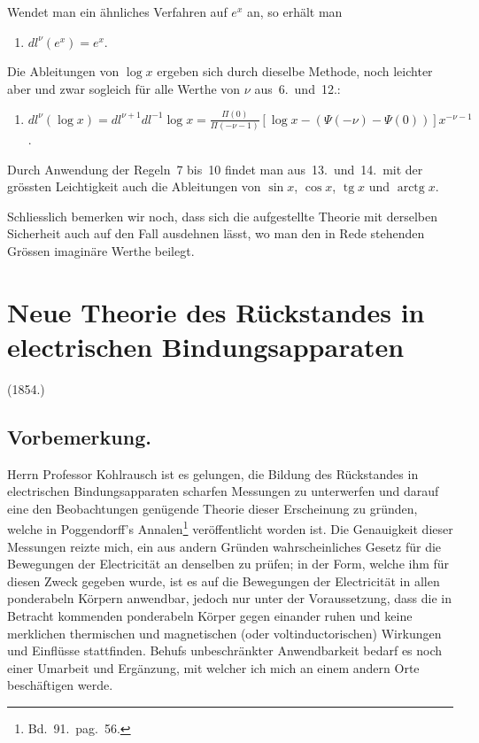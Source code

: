 \documentclass[12pt,a4paper]{article}
\DeclareMathOperator{\tg}{tg}
\DeclareMathOperator{\arctg}{arctg}
\begin{document}
Wendet man ein \"ahnliches Verfahren auf $e^x$ an, so erh\"alt man
\begin{enumerate}
\item[$13$.] $\displaystyle dl^\nu(e^x) = e^x$.
\end{enumerate}
Die Ableitungen von $\log x$ ergeben sich durch dieselbe Methode, noch leichter aber und zwar sogleich f\"ur alle Werthe von $\nu$ aus~6.\ und~12.:
\begin{enumerate}
\item[$14$.] $\displaystyle dl^\nu(\log x) = dl^{\nu+1}dl^{-1}\log x = \frac{\Pi(0)}{\Pi(-\nu-1)}\left[\log x - (\Psi(-\nu) - \Psi(0))\right]x^{-\nu-1}$.
\end{enumerate}
Durch Anwendung der Regeln~7 bis~10 findet man aus~13.\ und~14.\ mit der gr\"ossten Leichtigkeit auch die Ableitungen von $\sin x$, $\cos x$, $\tg x$ und $\arctg x$.

Schliesslich bemerken wir noch, dass sich die aufgestellte Theorie mit derselben Sicherheit auch auf den Fall ausdehnen l\"asst, wo man den in Rede stehenden Gr\"ossen imagin\"are Werthe beilegt.

\newpage

\section{Neue Theorie des R\"uckstandes in electrischen Bindungsapparaten}

\begin{footnotesize}
\begin{flushright}
(1854.)
\end{flushright}
\end{footnotesize}

\subsection*{Vorbemerkung.}

Herrn Professor Kohlrausch ist es gelungen, die Bildung des R\"uckstandes in electrischen Bindungsapparaten scharfen Messungen zu unterwerfen und darauf eine den Beobachtungen gen\"ugende Theorie dieser Erscheinung zu gr\"unden, welche in Poggendorff's Annalen\footnote{Bd.~91.\ pag.~56.} ver\"offentlicht worden ist. Die Genauigkeit dieser Messungen reizte mich, ein aus andern Gr\"unden wahrscheinliches Gesetz f\"ur die Bewegungen der Electricit\"at an denselben zu pr\"ufen; in der Form, welche ihm f\"ur diesen Zweck gegeben wurde, ist es auf die Bewegungen der Electricit\"at in allen ponderabeln K\"orpern anwendbar, jedoch nur unter der Voraussetzung, dass die in Betracht kommenden ponderabeln K\"orper gegen einander ruhen und keine merklichen thermischen und magnetischen (oder voltinductorischen) Wirkungen und Einfl\"usse stattfinden. Behufs unbeschr\"ankter Anwendbarkeit bedarf es noch einer Umarbeit und Erg\"anzung, mit welcher ich mich an einem andern Orte besch\"aftigen werde.
\end{document}
